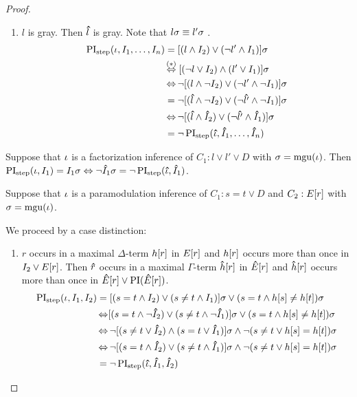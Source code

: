 \begin{proof}
\begin{indproof}
\begin{enumerate}
				\item $l$ is gray. Then $\bm\hat{l}$ is gray. 
					Note that $l\sigma \equiv l'\sigma$ \markB.
					\nopagebreak 
					\begin{align*}
						\PIstep(\inference, I_1, \dots, I_n) 
						&=  [(l \land I_2) \lor (\lnot l'  \land I_1)]\sigma\\
						&\hspace{-1pt}\stackrel{\mathclap{\markB}}\semiff[(\lnot l \lor I_2) \land (l' \lor I_1)]\sigma\\
						 &\semiff \lnot [(l \land \lnot I_2) \lor (\lnot l'  \land \lnot I_1)]\sigma\\
						 &= \lnot [(\p l \land\lnot I_2 ) \lor (\lnot \p{l'}\land \lnot I_1 )]\sigma\\
						 &\semiff \lnot  [(\p l \land \p I_2 ) \lor (\lnot \p{l'} \land \p I_1)]\sigma \\
						 &= \lnot \PIstep(\p \inference, \p I_1, \dots, \p I_n)
					\end{align*}
			\end{enumerate}

					Suppose that $\iota$ is a factorization inference of $C_1: l \lor l' \lor D$
					with $\sigma = \operatorname{mgu}(\iota)$.
					Then $\operatorname{PI}_{\mathrm{step}}(\iota, I_1) = I_1\sigma \;{\operatorname{\Leftrightarrow}}\; \lnot \bm\hat{I}_1\sigma = \lnot \operatorname{PI}_{\mathrm{step}}(\bm\hat{\iota}, \bm\hat{I}_1)$.

					Suppose that $\iota$ is a paramodulation inference of $C_1: s=t \lor D$ and $C_2: E[r]$ 
					with $\sigma = \operatorname{mgu}(\iota)$.

					We proceed by a case distinction:

					\begin{enumerate}
						\item $r$ occurs in a maximal $\Delta$-term $h[r]$ in $E[r]$ and $h[r]$ occurs more than once in $I_2 \lor E[r]$.
							Then $\bm\hat{r}$ occurs in a maximal $\Gamma$-term $\bm\hat{h}[r]$ in $\bm\hat{E}[r]$ and $\bm\hat{h}[r]$ occurs more than once in $\bm\hat{E}[r] \lor \operatorname{PI}(\bm\hat{E}[r])$.
							\begin{align*}
								\operatorname{PI}_{\mathrm{step}}(\iota, I_1, I_2) &= [ ( s=t \land I_2 ) \lor (s\neq t \land I_1) ]\sigma \lor (s=t \land h[s] \neq h[t])\sigma\\
														&\operatorname{\Leftrightarrow} [ ( s=t \land \lnot \bm\hat{I}_2 ) \lor (s\neq t \land \lnot \bm\hat{I}_1) ]\sigma \lor (s=t \land h[s] \neq h[t])\sigma\\
														&\operatorname{\Leftrightarrow} \lnot [ ( s\neq t \lor \bm\hat{I}_2 ) \land (s= t \lor \bm\hat{I}_1) ]\sigma \land \lnot (s\neq t \lor h[s] = h[t])\sigma\\
														&\operatorname{\Leftrightarrow} \lnot [ ( s = t \land \bm\hat{I}_2 ) \lor (s\neq t \land \bm\hat{I}_1) ]\sigma \land \lnot (s\neq t \lor h[s] = h[t])\sigma\\
													 &= \lnot \operatorname{PI}_{\mathrm{step}}(\bm\hat{\iota}, \bm\hat{I}_1, \bm\hat{I}_2)
							\end{align*}


\end{enumerate}
\end{indproof}
\end{proof}
